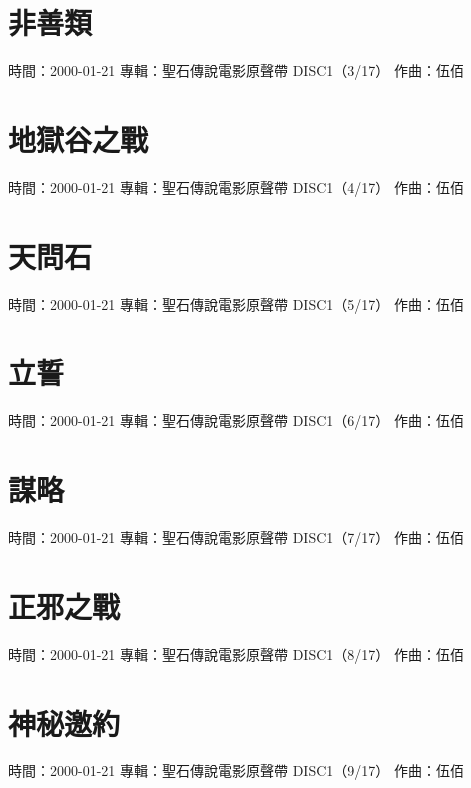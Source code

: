 \documentclass[UTF8,a4paper,oneside,twocolumn,12pt]{ctexbook}
\newcommand{\infopair}[2]{\textbullet #1：#2}
\newcommand{\zq}[1][伍佰]{\infopair{作曲}{#1}}
\newcommand{\zj}[1]{\infopair{專輯}{#1}}
\newcommand{\sj}[1]{\infopair{時間}{#1}}
\newenvironment{info}{\begin{flushleft}\kaishu
	}
	{\end{flushleft}\normalsize\yahei\par}
\begin{document}
\section{非善類}
\begin{info}
	\sj{2000-01-21}
	\zj{聖石傳說電影原聲帶 DISC1（3/17）}
	\zq
\end{info}

\section{地獄谷之戰}
\begin{info}
	\sj{2000-01-21}
	\zj{聖石傳說電影原聲帶 DISC1（4/17）}
	\zq
\end{info}

\section{天問石}
\begin{info}
	\sj{2000-01-21}
	\zj{聖石傳說電影原聲帶 DISC1（5/17）}
	\zq
\end{info}

\section{立誓}
\begin{info}
	\sj{2000-01-21}
	\zj{聖石傳說電影原聲帶 DISC1（6/17）}
	\zq
\end{info}

\section{謀略}
\begin{info}
	\sj{2000-01-21}
	\zj{聖石傳說電影原聲帶 DISC1（7/17）}
	\zq
\end{info}

\section{正邪之戰}
\begin{info}
	\sj{2000-01-21}
	\zj{聖石傳說電影原聲帶 DISC1（8/17）}
	\zq
\end{info}

\section{神秘邀約}
\begin{info}
	\sj{2000-01-21}
	\zj{聖石傳說電影原聲帶 DISC1（9/17）}
	\zq
\end{info}
\end{document}
